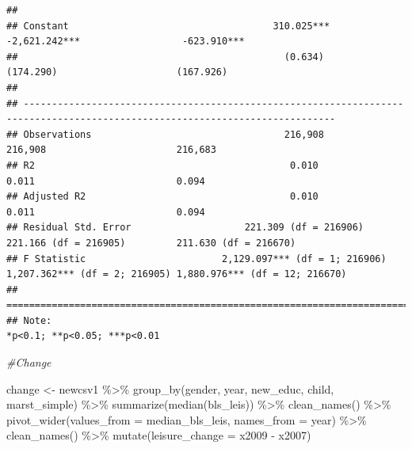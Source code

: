 \documentclass[
]{article}
\newenvironment{Shaded}{\begin{snugshade}}{\end{snugshade}}
\newcommand{\AttributeTok}[1]{\textcolor[rgb]{0.77,0.63,0.00}{#1}}
\newcommand{\CommentTok}[1]{\textcolor[rgb]{0.56,0.35,0.01}{\textit{#1}}}
\newcommand{\FunctionTok}[1]{\textcolor[rgb]{0.00,0.00,0.00}{#1}}
\newcommand{\NormalTok}[1]{#1}
\newcommand{\OtherTok}[1]{\textcolor[rgb]{0.56,0.35,0.01}{#1}}
\newcommand{\SpecialCharTok}[1]{\textcolor[rgb]{0.00,0.00,0.00}{#1}}
\begin{document}
\begin{verbatim}
##                                                                                                                              
## Constant                                    310.025***                   -2,621.242***                  -623.910***          
##                                               (0.634)                      (174.290)                     (167.926)           
##                                                                                                                              
## -----------------------------------------------------------------------------------------------------------------------------
## Observations                                  216,908                       216,908                       216,683            
## R2                                             0.010                         0.011                         0.094             
## Adjusted R2                                    0.010                         0.011                         0.094             
## Residual Std. Error                    221.309 (df = 216906)         221.166 (df = 216905)         211.630 (df = 216670)     
## F Statistic                        2,129.097*** (df = 1; 216906) 1,207.362*** (df = 2; 216905) 1,880.976*** (df = 12; 216670)
## =============================================================================================================================
## Note:                                                                                             *p<0.1; **p<0.05; ***p<0.01
\end{verbatim}

\begin{Shaded}
\begin{Highlighting}[]
\CommentTok{\#Change}

\NormalTok{change }\OtherTok{\textless{}{-}}\NormalTok{ newcsv1 }\SpecialCharTok{\%\textgreater{}\%}
  \FunctionTok{group\_by}\NormalTok{(gender,  year, new\_educ, child, marst\_simple) }\SpecialCharTok{\%\textgreater{}\%}
  \FunctionTok{summarize}\NormalTok{(}\FunctionTok{median}\NormalTok{(bls\_leis)) }\SpecialCharTok{\%\textgreater{}\%}
  \FunctionTok{clean\_names}\NormalTok{() }\SpecialCharTok{\%\textgreater{}\%}
  \FunctionTok{pivot\_wider}\NormalTok{(}\AttributeTok{values\_from =}\NormalTok{ median\_bls\_leis, }\AttributeTok{names\_from =}\NormalTok{ year) }\SpecialCharTok{\%\textgreater{}\%}
  \FunctionTok{clean\_names}\NormalTok{() }\SpecialCharTok{\%\textgreater{}\%}
  \FunctionTok{mutate}\NormalTok{(}\AttributeTok{leisure\_change =}\NormalTok{ x2009 }\SpecialCharTok{{-}}\NormalTok{ x2007)}
\end{Highlighting}
\end{Shaded}
\end{document}
